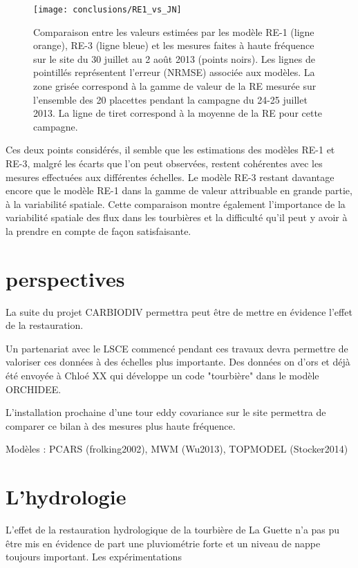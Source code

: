 \begin{figure}
\centering
\texttt{[image: conclusions/RE1\_vs\_JN]}
\caption{Comparaison entre les valeurs estimées par les modèle RE-1 (ligne orange), RE-3 (ligne bleue) et les mesures faites à haute fréquence sur le site du 30 juillet au 2 août 2013 (points noirs). Les lignes de pointillés représentent l'erreur (NRMSE) associée aux modèles. La zone grisée correspond à la gamme de valeur de la RE mesurée sur l'ensemble des 20 placettes pendant la campagne du 24-25 juillet 2013. La ligne de tiret correspond à la moyenne de la RE pour cette campagne.}
\label{fig:RE1_vs_JN}
\end{figure}

Ces deux points considérés, il semble que les estimations des modèles RE-1 et RE-3, malgré les écarts que l'on peut observées, restent cohérentes avec les mesures effectuées aux différentes échelles.
Le modèle RE-3 restant davantage encore que le modèle RE-1 dans la gamme de valeur attribuable en grande partie, à la variabilité spatiale.
Cette comparaison montre également l'importance de la variabilité spatiale des flux dans les tourbières et la difficulté qu'il peut y avoir à la prendre en compte de façon satisfaisante.



\section*{perspectives}

La suite du projet CARBIODIV permettra peut être de mettre en évidence l'effet de la restauration.

Un partenariat avec le LSCE commencé pendant ces travaux devra permettre de valoriser ces données à des échelles plus importante.
Des données on d'ors et déjà été envoyée à Chloé XX qui développe un code "tourbière" dans le modèle ORCHIDEE.

L'installation prochaine d'une tour eddy covariance sur le site permettra de comparer ce bilan à des mesures plus haute fréquence.

Modèles : PCARS (frolking2002), MWM (Wu2013), TOPMODEL (Stocker2014)




\section*{L'hydrologie}

L'effet de la restauration hydrologique de la tourbière de La Guette n'a pas pu être mis en évidence de part une pluviométrie forte et un niveau de nappe toujours important.
Les expérimentations

